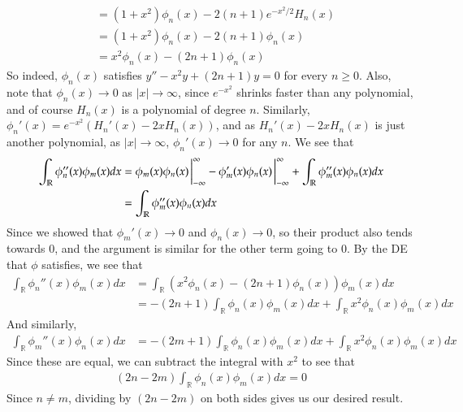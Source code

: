 \documentclass[12pt]{article}
\def\mbb#1{\mathbb{#1}}
\def \R{\mbb{R}}
\theoremstyle{definition}
\theoremstyle{remark}
\renewcommand{\geq}{\geqslant}
\begin{document}
\begin{enumerate}[leftmargin=\labelsep]
\begin{align*}
			 &= (1+x^2)\phi_n(x) - 2(n+1)e^{-x^2/2} H_{n}(x) \\
			 &= (1+x^2)\phi_n(x) - 2(n+1)\phi_{n}(x) \\
			 &= x^2\phi_n(x) - (2n+1)\phi_n(x)
		\end{align*}
		So indeed, $\phi_n(x)$ satisfies $y''-x^2y + (2n+1)y = 0$ for every $n \geq 0$. Also, note that $\phi_n(x) \to 0$ as $|x| \to \infty$, since $e^{-x^2}$ shrinks faster than any polynomial, and of course $H_n(x)$ is a polynomial of degree $n$. Similarly, $\phi_n'(x) = e^{-x^2}(H_n'(x) - 2xH_n(x))$, and as $H_n'(x) - 2xH_n(x)$ is just another polynomial, as $|x| \to \infty$, $\phi_n'(x) \to 0$ for any $n$. We see that
		\begin{align*}
			\int_\R \phi_n''(x) \phi_m(x)dx &= \phi_m(x) \phi_n(x) \eval_{-\infty}^\infty - \phi_m'(x) \phi_n(x) \eval_{-\infty}^\infty + \int_\R \phi_m''(x)\phi_n(x)dx \\
			&= \int_\R \phi_m''(x)\phi_n(x)dx
		\end{align*}
		Since we showed that $\phi_m'(x) \to 0$ and $\phi_n(x) \to 0$, so their product also tends towards 0, and the argument is similar for the other term going to 0. By the DE that $\phi$ satisfies, we see that
		\begin{align*}
			\int_\R \phi_n''(x) \phi_m(x)dx &= \int_\R (x^2\phi_n(x) - (2n+1)\phi_n(x))\phi_m(x)dx \\
			&= -(2n+1)\int_\R \phi_n(x)\phi_m(x)dx + \int_\R x^2\phi_n(x)\phi_m(x)dx
		\end{align*}
		And similarly,
		\begin{align*}
			\int_\R \phi_m''(x)\phi_n(x)dx &= -(2m+1)\int_\R \phi_n(x)\phi_m(x)dx + \int_\R x^2\phi_n(x)\phi_m(x)dx
		\end{align*}
		Since these are equal, we can subtract the integral with $x^2$ to see that
		\begin{align*}
			(2n-2m)\int_\R \phi_n(x)\phi_m(x)dx = 0
		\end{align*}
		Since $n \neq m$, dividing by $(2n-2m)$ on both sides gives us our desired result.
		

\end{enumerate}
\end{document}
